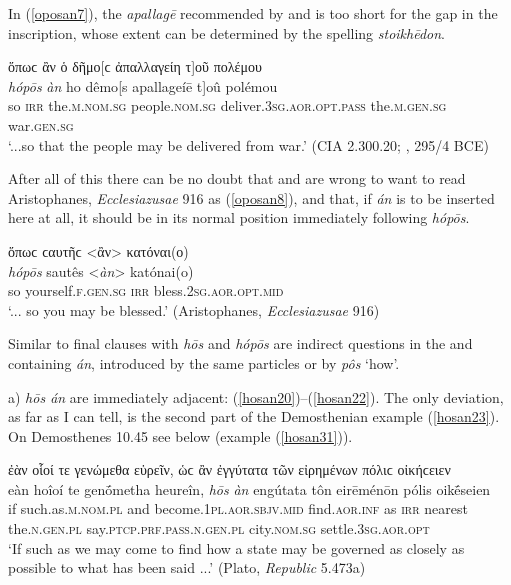 In (\ref{oposan7}), the  \emph{apallagē} recommended by \citet[75--76]{Herwerden1880} and \citet[3]{Weber1885} is too short for the gap in the inscription, whose extent can be determined by the spelling \emph{stoikhēdon}.

\begin{exe}
\ex ὅπωϲ ἂν ὁ δῆμο{[ϲ ἀπαλλαγείη τ{]}οῦ πολέμου}\\
\gll \emph{hópōs} \emph{àn} ho dêmo{[}s apallageíē t{]}oû polémou\\
so \textsc{irr} the.\textsc{m.nom.sg} people.\textsc{nom.sg}
deliver.\textsc{3sg.aor.opt.pass} the.\textsc{m.gen.sg} war.\textsc{gen.sg}\\
\trans `...so that the people may be delivered from war.' (CIA 2.300.20; \citealp[123--124]{Koehler1877}, 295/4 BCE)
\label{oposan7}
\end{exe}

After all of this there can be no doubt that \citet[746]{Hermann1816} and \citet[77]{Velsen1883} are wrong to want to read Aristophanes, \textit{Ecclesiazusae} 916 as (\ref{oposan8}), and that, if \emph{án} is to be inserted here at all, it should be in its normal position immediately following \emph{hópōs}.

\begin{exe}
\ex ὅπωϲ ϲαυτῆϲ \textless{}ἂν\textgreater{} κατόναι(ο)\\
\gll \emph{hópōs} sautês \textless{}\emph{àn}\textgreater{} katónai(o)\\
so yourself.\textsc{f.gen.sg} \textsc{irr} bless.\textsc{2sg.aor.opt.mid}\\
\trans `... so you may be blessed.' (Aristophanes, \textit{Ecclesiazusae} 916)
\label{oposan8}
\end{exe}

Similar to final clauses with \emph{hōs} and \emph{hópōs} are indirect questions in the  and containing \emph{án}, introduced by the same particles or by \textit{pôs} `how'.

a) \emph{hōs án} are immediately adjacent: (\ref{hosan20})--(\ref{hosan22}). The only deviation, as far as I can tell, is the second part of the Demosthenian example (\ref{hosan23}). On Demosthenes 10.45 see below (example (\ref{hosan31})).

\begin{exe}
\ex ἐὰν οἷοί τε γενώμεθα εὑρεῖν, ὡϲ ἂν ἐγγύτατα τῶν εἰρημένων πόλιϲ οἰκήϲειεν\\
\gll eàn hoîoí te genṓmetha heureîn, \emph{hōs} \emph{àn} engútata tôn eirēménōn pólis oikḗseien\\
if such.as.\textsc{m.nom.pl} and become.\textsc{1pl.aor.sbjv.mid} find.\textsc{aor.inf} as \textsc{irr} nearest the.\textsc{n.gen.pl} say.\textsc{ptcp.prf.pass.n.gen.pl} city.\textsc{nom.sg} settle.\textsc{3sg.aor.opt}\\
\trans `If such as we may come to find how a state may be governed as closely as possible to what has been said ...' (Plato, \textit{Republic} 5.473a)
\label{hosan20}
\end{exe}

